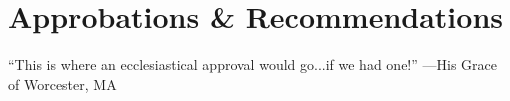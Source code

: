 \documentclass[10pt]{book}
\begin{document}
\section{Approbations \& Recommendations}
``This is where an ecclesiastical approval would go...if we had one!'' ---His Grace of Worcester, MA
\newpage




%
%
%
%













%
%


%

%
%

%
%
%

\end{document}
